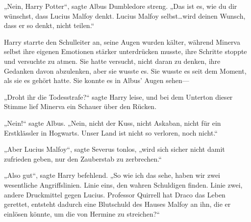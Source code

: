 „Nein, Harry Potter“, sagte Albus Dumbledore streng. „Das ist es, wie du dir wünschst, dass Lucius Malfoy denkt. Lucius Malfoy selbst…wird deinen Wunsch, dass er so denkt, nicht teilen.“

Harry starrte den Schulleiter an, seine Augen wurden kälter, während Minerva selbst ihre eigenen Emotionen stärker unterdrücken musste, ihre Schritte stoppte und versuchte zu atmen. Sie hatte versucht, nicht daran zu denken, ihre Gedanken davon abzulenken, aber sie wusste es. Sie wusste es seit dem Moment, als sie es gehört hatte. Sie konnte es in Albus' Augen sehen—

„Droht ihr die Todesstrafe?“ sagte Harry leise, und bei dem Unterton dieser Stimme lief Minerva ein Schauer über den Rücken.

„Nein!“ sagte Albus. „Nein, nicht der Kuss, nicht Askaban, nicht für ein Erstklässler in Hogwarts. Unser Land ist nicht so verloren, noch nicht.“

„Aber Lucius Malfoy“, sagte Severus tonlos, „wird sich sicher nicht damit zufrieden geben, nur den Zauberstab zu zerbrechen.“

„Also gut“, sagte Harry befehlend. „So wie ich das sehe, haben wir zwei wesentliche Angriffslinien. Linie eins, den wahren Schuldigen finden. Linie zwei, andere Druckmittel gegen Lucius. Professor Quirrell hat Draco das Leben gerettet, entsteht dadurch eine Blutschuld des Hauses Malfoy an ihn, die er einlösen könnte, um die von Hermine zu streichen?“

